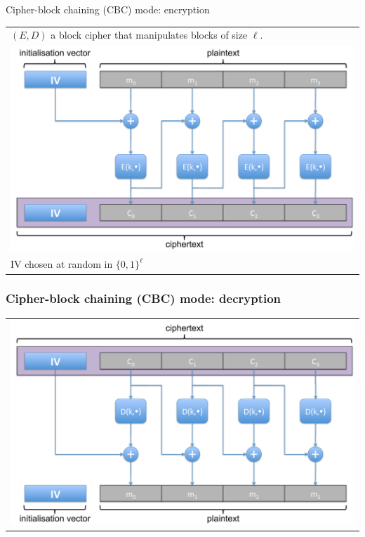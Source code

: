 \documentclass[aspectratio=169, lualatex, handout, 10pt,dvipsnames,svgnames]{beamer} %
\begin{document}
\begin{frame}{Cipher-block chaining (CBC) mode: encryption}
  \vspace{-0.5cm}
  \begin{center}
  \begin{tabular}{l}
    \noindent
    $(E, D)$ a block cipher that manipulates blocks of size $\ell$.\\
    \includegraphics[scale=0.32]{Images/CBCenc.pdf} \\
    IV chosen at random in $\{0, 1\}^\ell$
  \end{tabular}
\end{center}
  

\end{frame}

\begin{frame}

  \frametitle{Cipher-block chaining (CBC) mode: decryption}
 \vspace{-0.5cm}
\begin{center}
  \begin{tabular}{l}
    \includegraphics[scale=0.35]{Images/CBCdec.pdf}
  \end{tabular}
\end{center}

\end{frame}
\end{document}
